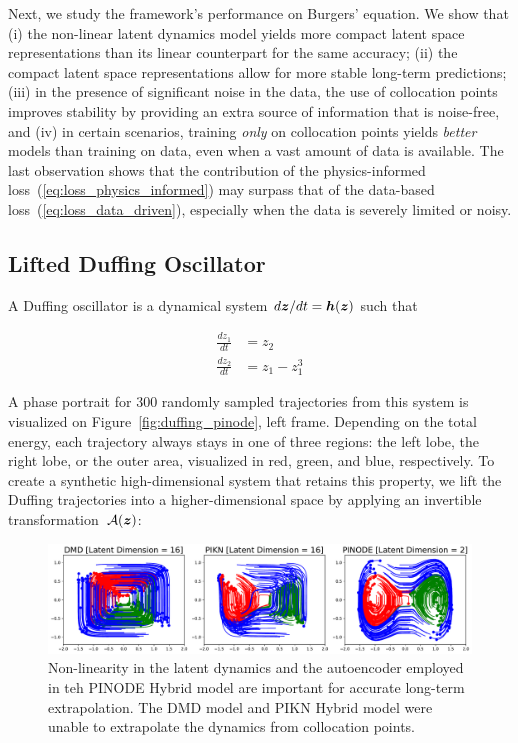 Next, we study the framework's performance on Burgers' equation. We show that (i) the non-linear latent dynamics model yields more compact latent space representations than its linear counterpart for the same accuracy; (ii) the compact latent space representations allow for more stable long-term predictions; (iii) in the presence of significant noise in the data, the use of collocation points improves stability by providing an extra source of information that is noise-free, and (iv) in certain scenarios, training \textit{only} on collocation points yields \textit{better} models than training on data, even when a vast amount of data is available. The last observation shows that the contribution of the physics-informed loss~(\ref{eq:loss_physics_informed}) may surpass that of the data-based loss~(\ref{eq:loss_data_driven}), especially when the data is severely limited or noisy. 



\subsection{Lifted Duffing Oscillator}
\label{sec:duffing}

A Duffing oscillator is a dynamical system $d\boldsymbol{z}/dt = \boldsymbol{h}(\boldsymbol{z})$ such that 

\begin{equation}
    \label{eq:duffing_definition}
    \begin{split}
    \frac{dz_1}{dt} & = z_2 \\ 
    \frac{dz_2}{dt} & = z_1 - z_1^3
    \end{split}
\end{equation}

A phase portrait for 300 randomly sampled trajectories from this system is visualized on Figure~\ref{fig:duffing_pinode}, left frame. Depending on the total energy, each trajectory always stays in one of three regions: the left lobe, the right lobe, or the outer area, visualized in red, green, and blue, respectively. To create a synthetic high-dimensional system that retains this property, we lift the Duffing trajectories into a higher-dimensional space by applying an invertible transformation~$\mathcal{A}(\boldsymbol{z})$: 

\begin{figure}
  \includegraphics[width=\textwidth]{figures/duffing_comparison.pdf}
  \caption{\label{fig:duffing_comparison}Non-linearity in the latent dynamics and the autoencoder employed in teh PINODE Hybrid model are important for accurate long-term extrapolation. The DMD model and PIKN Hybrid model were unable to extrapolate the dynamics from collocation points.}%
\end{figure}

